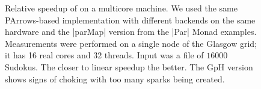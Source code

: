 \begin{figure}
\centering
%
{\label{subfig:speedupSudokuSM16000}}%
{\label{subfig:performanceSudokuSM16000}}
\caption{Relative speedup of \sudokutest on a multicore machine. We used the same PArrows-based implementation with
  different backends on the same hardware and the |parMap| version from the |Par| Monad examples. Measurements were performed on a single node of the Glasgow
  grid; it has 16 real cores and 32 threads. Input was a file of $16000$ Sudokus. The
  closer to linear speedup the better. The GpH version shows signs of choking with too many sparks being created.}
\label{fig:sudokuSMBenchmark16000}
\end{figure}
